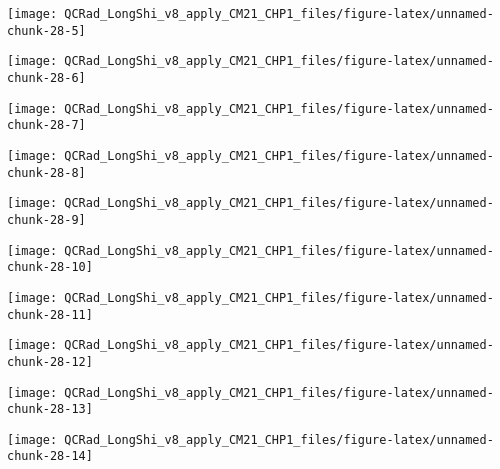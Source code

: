 \documentclass[
  10pt,
  a4paper,oneside]{article}
\begin{document}
\begin{center}\texttt{[image: QCRad\_LongShi\_v8\_apply\_CM21\_CHP1\_files/figure-latex/unnamed-chunk-28-5]} \end{center}

\begin{center}\texttt{[image: QCRad\_LongShi\_v8\_apply\_CM21\_CHP1\_files/figure-latex/unnamed-chunk-28-6]} \end{center}

\begin{center}\texttt{[image: QCRad\_LongShi\_v8\_apply\_CM21\_CHP1\_files/figure-latex/unnamed-chunk-28-7]} \end{center}

\begin{center}\texttt{[image: QCRad\_LongShi\_v8\_apply\_CM21\_CHP1\_files/figure-latex/unnamed-chunk-28-8]} \end{center}

\begin{center}\texttt{[image: QCRad\_LongShi\_v8\_apply\_CM21\_CHP1\_files/figure-latex/unnamed-chunk-28-9]} \end{center}

\begin{center}\texttt{[image: QCRad\_LongShi\_v8\_apply\_CM21\_CHP1\_files/figure-latex/unnamed-chunk-28-10]} \end{center}

\begin{center}\texttt{[image: QCRad\_LongShi\_v8\_apply\_CM21\_CHP1\_files/figure-latex/unnamed-chunk-28-11]} \end{center}

\begin{center}\texttt{[image: QCRad\_LongShi\_v8\_apply\_CM21\_CHP1\_files/figure-latex/unnamed-chunk-28-12]} \end{center}

\begin{center}\texttt{[image: QCRad\_LongShi\_v8\_apply\_CM21\_CHP1\_files/figure-latex/unnamed-chunk-28-13]} \end{center}

\begin{center}\texttt{[image: QCRad\_LongShi\_v8\_apply\_CM21\_CHP1\_files/figure-latex/unnamed-chunk-28-14]} \end{center}
\end{document}
